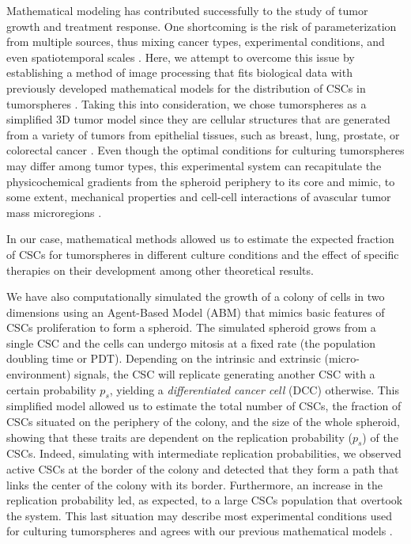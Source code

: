 \documentclass[fleqn,10pt]{wlscirep}
\begin{document}
Mathematical modeling has contributed successfully to the study of tumor growth and treatment response. One shortcoming is the risk of parameterization from multiple sources, thus mixing cancer types, experimental conditions, and even spatiotemporal scales \cite{Brady2019}. Here, we attempt to overcome this issue by establishing a method of image processing that fits biological data with previously developed mathematical models for the distribution of CSCs in tumorspheres \cite{barberis2021percolation}. Taking this into consideration, we chose tumorspheres as a simplified 3D tumor model since they are cellular structures that are generated from a variety of tumors from epithelial tissues, such as breast, lung, prostate, or colorectal cancer \cite{Zanoni2020}. Even though the optimal conditions for culturing tumorspheres may differ among tumor types, this experimental system can recapitulate the physicochemical gradients from the spheroid periphery to its core and mimic, to some extent, mechanical properties and cell-cell interactions of avascular tumor mass microregions \cite{Rolver2019,Zanoni2020}. 

In our case, mathematical methods allowed us to estimate the expected fraction of CSCs for tumorspheres in different culture conditions\cite{benitez2019, barberis2021diff, benitez2021} and the effect of specific therapies on their development\cite{fotinos23} among other theoretical results\cite{Condat2006, Delsanto2008, Menchon2011, Barberis2015}.  

We have also computationally simulated the growth of a colony of cells in two dimensions using an Agent-Based Model (ABM) that mimics basic features of CSCs proliferation to form a spheroid\cite{barberis2021percolation}. The simulated spheroid grows from a single CSC and the cells can undergo mitosis at a fixed rate (the population doubling time or PDT). Depending on the intrinsic and extrinsic (micro-environment) signals, the CSC will replicate generating another CSC with a certain probability $p_s$, yielding a \emph{differentiated cancer cell} (DCC) otherwise. This simplified model allowed us to estimate the total number of CSCs, the fraction of CSCs situated on the periphery of the colony, and the size of the whole spheroid, showing that these traits are dependent on the replication probability ($p_s$) of the CSCs. Indeed, simulating with intermediate replication probabilities, we observed active CSCs at the border of the colony and detected that they form a path that links the center of the colony with its border. Furthermore, an increase in the replication probability led, as expected, to a large CSCs population that overtook the system. This last situation may describe most experimental conditions used for culturing tumorspheres \cite{chen2016,wang2016, Dontu, Leis, Marks2024} and agrees with our previous mathematical models \cite{benitez2019, barberis2021diff, benitez2021}.
\end{document}
